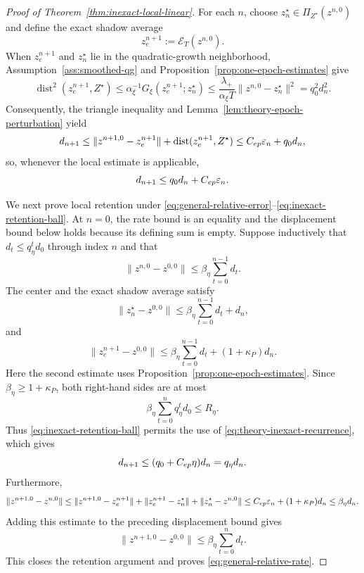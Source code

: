 \documentclass[10pt,a4paper]{amsart}
\begin{document}
\begin{proof}[Proof of Theorem~\ref{thm:inexact-local-linear}]
For each $n$, choose
$z_n^\star\in\Pi_{Z^\star}(z^{n,0})$ and define the exact shadow average
\[
    z_e^{n+1}
    :=
    \mathcal E_T(z^{n,0}).
\]
When $z_e^{n+1}$ and $z_n^\star$ lie in the quadratic-growth neighborhood,
Assumption~\ref{ass:smoothed-qg} and
Proposition~\ref{prop:one-epoch-estimates} give
\[
    \operatorname{dist}^2(z_e^{n+1},Z^\star) \le \alpha_\xi^{-1}G_\xi(z_e^{n+1};z_n^\star) \le \frac{\lambda_+}{\alpha_\xi T} \|z^{n,0}-z_n^\star\|^2 = q_0^2d_n^2.
\]
Consequently, the triangle inequality and
Lemma~\ref{lem:theory-epoch-perturbation} yield
\[
    d_{n+1} \le \|z^{n+1,0}-z_e^{n+1}\| + \operatorname{dist}(z_e^{n+1},Z^\star) \le C_{\rm ep}\varepsilon_n+q_0d_n,
\]
so, whenever the local estimate is applicable,
\begin{equation}
\label{eq:theory-inexact-recurrence}
    d_{n+1}
    \le
    q_0d_n+C_{\rm ep}\varepsilon_n.
\end{equation}

We next prove local retention under
\eqref{eq:general-relative-error}--\eqref{eq:inexact-retention-ball}.  At
$n=0$, the rate bound is an equality and the displacement bound below holds
because its defining sum is empty.  Suppose inductively that
$d_t\le q_\eta^td_0$ through index $n$ and that
\[
    \|z^{n,0}-z^{0,0}\|
    \le
    \beta_\eta\sum_{t=0}^{n-1}d_t.
\]
The center and the exact shadow average satisfy
\[
    \|z_n^\star-z^{0,0}\|
    \le
    \beta_\eta\sum_{t=0}^{n-1}d_t+d_n,
\]
and
\[
    \|z_e^{n+1}-z^{0,0}\|
    \le
    \beta_\eta\sum_{t=0}^{n-1}d_t
    +(1+\kappa_P)d_n.
\]
Here the second estimate uses
Proposition~\ref{prop:one-epoch-estimates}.  Since
$\beta_\eta\ge1+\kappa_P$, both right-hand sides are at most
\[
    \beta_\eta\sum_{t=0}^{n}q_\eta^td_0
    \le
    R_\eta.
\]
Thus \eqref{eq:inexact-retention-ball} permits the use of
\eqref{eq:theory-inexact-recurrence}, which gives
\[
    d_{n+1}
    \le
    (q_0+C_{\rm ep}\eta)d_n
    =
    q_\eta d_n.
\]
Furthermore,
\[
    \|z^{n+1,0}-z^{n,0}\| \le \|z^{n+1,0}-z_e^{n+1}\| + \|z_e^{n+1}-z_n^\star\| + \|z_n^\star-z^{n,0}\| \le C_{\rm ep}\varepsilon_n+(1+\kappa_P)d_n \le \beta_\eta d_n.
\]
Adding this estimate to the preceding displacement bound gives
\[
    \|z^{n+1,0}-z^{0,0}\|
    \le
    \beta_\eta\sum_{t=0}^{n}d_t.
\]
This closes the retention argument and proves
\eqref{eq:general-relative-rate}.
\end{proof}
\end{document}
